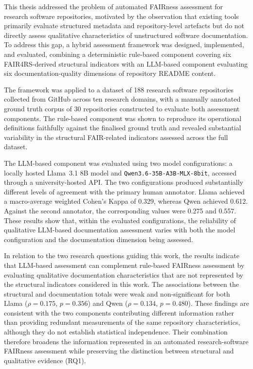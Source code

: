 This thesis addressed the problem of automated FAIRness assessment
for research software repositories, motivated by the observation
that existing tools primarily evaluate structured metadata and
repository-level artefacts but do not directly assess qualitative
characteristics of unstructured software documentation. To address
this gap, a hybrid assessment framework was designed, implemented,
and evaluated, combining a deterministic rule-based component
covering six FAIR4RS-derived structural indicators with an LLM-based
component evaluating six documentation-quality dimensions of
repository README content.

The framework was applied to a dataset of 188 research software
repositories collected from GitHub across ten research domains, with
a manually annotated ground truth corpus of 30 repositories
constructed to evaluate both assessment components. The rule-based
component was shown to reproduce its operational definitions
faithfully against the finalised ground truth and revealed substantial
variability in the structural FAIR-related indicators assessed across
the full dataset.

The LLM-based component was evaluated using two model configurations:
a locally hosted Llama~3.1 8B model and
\texttt{Qwen3.6-35B-A3B-MLX-8bit}, accessed through a
university-hosted API. The two configurations produced substantially
different levels of agreement with the primary human annotator.
Llama achieved a macro-average weighted Cohen's Kappa of 0.329,
whereas Qwen achieved 0.612. Against the second annotator, the
corresponding values were 0.275 and 0.557. These results show that,
within the evaluated configurations, the reliability of qualitative
LLM-based documentation assessment varies with both the model
configuration and the documentation dimension being assessed.

In relation to the two research questions guiding this work, the
results indicate that LLM-based assessment can complement rule-based
FAIRness assessment by evaluating qualitative documentation
characteristics that are not represented by the structural indicators
considered in this work. The associations between the structural and
documentation totals were weak and non-significant for both Llama
($\rho=0.175$, $p=0.356$) and Qwen
($\rho=0.134$, $p=0.480$). These findings are consistent with the two
components contributing different information rather than providing
redundant measurements of the same repository characteristics,
although they do not establish statistical independence. Their
combination therefore broadens the information represented in an
automated research-software FAIRness assessment while preserving the
distinction between structural and qualitative evidence (RQ1).

